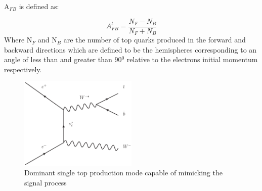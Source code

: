 A$_{FB}$ is defined as:

\begin{equation}
A_{FB}^t=\frac{N_F-N_B}{N_F+N_B}
\end{equation}
Where N$_{F}$ and N$_{B}$ are the number of top quarks produced in the forward and backward directions which are defined to be the hemispheres corresponding to an angle of less than and greater than 90$^0$ relative to the electrons initial momentum respectively.

\begin{figure}[]
  \centering
  \includegraphics[width=0.5\textwidth]{TopAnalysis/figures/SingleTop}
  \caption[Dominant single top production mode]{Dominant single top production mode capable of mimicking the signal process}
  \label{fig:singletop}
\end{figure}


